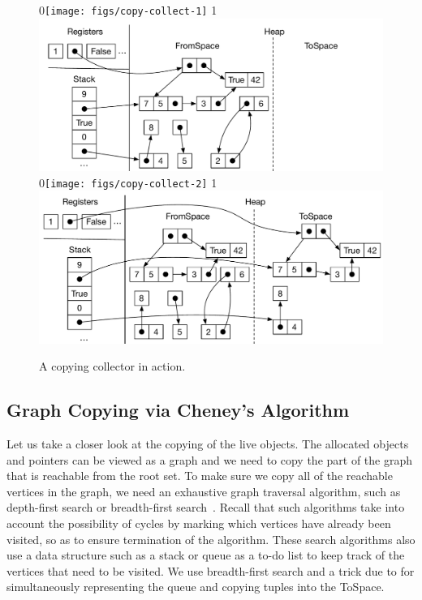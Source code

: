\documentclass[7x10,nocrop]{TimesAPriori_MIT}%
\def\racketEd{0}
\def\pythonEd{1}
\def\edition{1}
\newcommand{\racket}[1]{{\if\edition\racketEd{#1}\fi}}
\newcommand{\python}[1]{{\if\edition\pythonEd #1\fi}}
\begin{document}
\begin{figure}[tbp]
\centering
\racket{\texttt{[image: figs/copy-collect-1]}}
\python{\includegraphics[width=\textwidth]{figs/copy-collect-1-python}}
\\[5ex]
\racket{\texttt{[image: figs/copy-collect-2]}}
\python{\includegraphics[width=\textwidth]{figs/copy-collect-2-python}}
\caption{A copying collector in action.}
\label{fig:copying-collector}
\end{figure}

\subsection{Graph Copying via Cheney's Algorithm}
\label{sec:cheney}
Let us take a closer look at the copying of the live objects. The
allocated objects and pointers can be viewed as a graph and we need to
copy the part of the graph that is reachable from the root set. To
make sure we copy all of the reachable vertices in the graph, we need
an exhaustive graph traversal algorithm, such as depth-first search or
breadth-first search~\citep{Moore:1959aa,Cormen:2001uq}. Recall that
such algorithms take into account the possibility of cycles by marking
which vertices have already been visited, so as to ensure termination
of the algorithm. These search algorithms also use a data structure
such as a stack or queue as a to-do list to keep track of the vertices
that need to be visited. We use breadth-first search and a trick
due to \citet{Cheney:1970aa} for simultaneously representing the queue
and copying tuples into the ToSpace.
\end{document}

